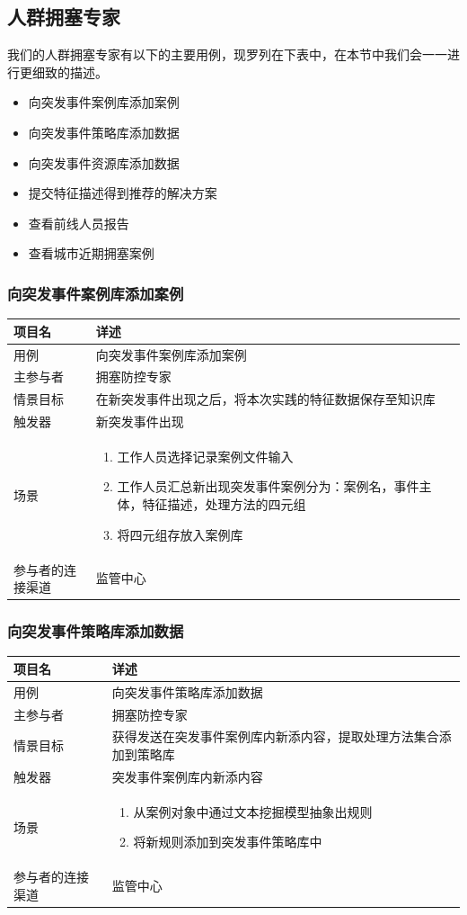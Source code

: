\documentclass{ctexrep}
\begin{document}
\subsection{人群拥塞专家}
我们的人群拥塞专家有以下的主要用例，现罗列在下表中，在本节中我们会一一进行更细致的描述。
\begin{itemize}
\item 向突发事件案例库添加案例
\item 向突发事件策略库添加数据
\item 向突发事件资源库添加数据
\item 提交特征描述得到推荐的解决方案
\item 查看前线人员报告
\item 查看城市近期拥塞案例
\end{itemize}
\subsubsection{向突发事件案例库添加案例}
\begin{longtable}{p{2cm} | p{10cm}}
\hline
项目名 & 详述 \\
\hline
\hline
用例 & 向突发事件案例库添加案例\\
\hline
主参与者 & 拥塞防控专家\\
\hline
情景目标 & 在新突发事件出现之后，将本次实践的特征数据保存至知识库 \\
\hline
触发器 & 新突发事件出现\\
\hline
场景 & \begin{enumerate}
	\item 工作人员选择记录案例文件输入
	\item 工作人员汇总新出现突发事件案例分为：案例名，事件主体，特征描述，处理方法的四元组
	\item 将四元组存放入案例库
\end{enumerate} \\
\hline
参与者的连接渠道 & 监管中心 \\
\hline
\end{longtable}

\subsubsection{向突发事件策略库添加数据}
\begin{longtable}{p{2cm} | p{10cm}}
\hline
项目名 & 详述 \\
\hline
\hline
用例 & 向突发事件策略库添加数据\\
\hline
主参与者 & 拥塞防控专家\\
\hline
情景目标 & 获得发送在突发事件案例库内新添内容，提取处理方法集合添加到策略库 \\
\hline
触发器 & 突发事件案例库内新添内容\\
\hline
场景 & \begin{enumerate}
	\item 从案例对象中通过文本挖掘模型抽象出规则
	\item 将新规则添加到突发事件策略库中
\end{enumerate} \\
\hline
参与者的连接渠道 & 监管中心 \\
\hline
\end{longtable}
\end{document}
